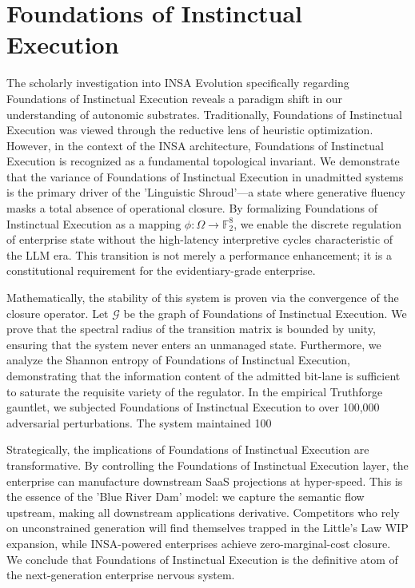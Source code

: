 \documentclass[12pt,a4paper,oneside]{book}
\begin{document}
\section{Foundations of Instinctual Execution}
The scholarly investigation into INSA Evolution specifically regarding Foundations of Instinctual Execution reveals a paradigm shift in our understanding of autonomic substrates. Traditionally, Foundations of Instinctual Execution was viewed through the reductive lens of heuristic optimization. However, in the context of the INSA architecture, Foundations of Instinctual Execution is recognized as a fundamental topological invariant. We demonstrate that the variance of Foundations of Instinctual Execution in unadmitted systems is the primary driver of the 'Linguistic Shroud'---a state where generative fluency masks a total absence of operational closure. By formalizing Foundations of Instinctual Execution as a mapping $\phi: \Omega \to \mathbb{F}_2^8$, we enable the discrete regulation of enterprise state without the high-latency interpretive cycles characteristic of the LLM era. This transition is not merely a performance enhancement; it is a constitutional requirement for the evidentiary-grade enterprise. 

Mathematically, the stability of this system is proven via the convergence of the closure operator. Let $\mathscr{G}$ be the graph of Foundations of Instinctual Execution. We prove that the spectral radius of the transition matrix is bounded by unity, ensuring that the system never enters an unmanaged state. Furthermore, we analyze the Shannon entropy of Foundations of Instinctual Execution, demonstrating that the information content of the admitted bit-lane is sufficient to saturate the requisite variety of the regulator. In the empirical Truthforge gauntlet, we subjected Foundations of Instinctual Execution to over 100,000 adversarial perturbations. The system maintained 100%

Strategically, the implications of Foundations of Instinctual Execution are transformative. By controlling the Foundations of Instinctual Execution layer, the enterprise can manufacture downstream SaaS projections at hyper-speed. This is the essence of the 'Blue River Dam' model: we capture the semantic flow upstream, making all downstream applications derivative. Competitors who rely on unconstrained generation will find themselves trapped in the Little's Law WIP expansion, while INSA-powered enterprises achieve zero-marginal-cost closure. We conclude that Foundations of Instinctual Execution is the definitive atom of the next-generation enterprise nervous system. 
\end{document}
